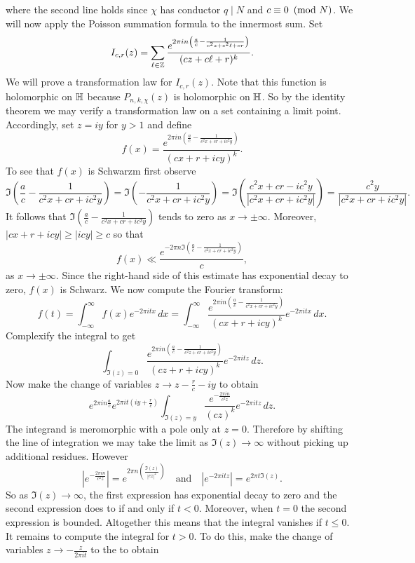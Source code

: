       where the second line holds since $\chi$ has conductor $q \mid N$ and $c \equiv 0 \ \left(\text{mod }N\right)$. We will now apply the Poisson summation formula to the innermost sum. Set
      \[
        I_{c,r}(z) = \sum_{\ell \in \mathbb{Z}}\frac{e^{2\pi in\left(\frac{a}{c}-\frac{1}{c^{2}z+c^{2}\ell+cr}\right)}}{(cz+c\ell+r)^{k}}.
      \]
      We will prove a transformation law for $I_{c,r}(z)$. Note that this function is holomorphic on $\mathbb{H}$ because $P_{n,k,\chi}(z)$ is holomorphic on $\mathbb{H}$. So by the identity theorem we may verify a transformation law on a set containing a limit point. Accordingly, set $z = iy$ for $y > 1$ and define
      \[
        f(x) = \frac{e^{2\pi in\left(\frac{a}{c}-\frac{1}{c^{2}x+cr+ic^{2}y}\right)}}{(cx+r+icy)^{k}}.
      \]
      To see that $f(x)$ is Schwarzm first observe
      \[
        \Im\left(\frac{a}{c}-\frac{1}{c^{2}x+cr+ic^{2}y}\right) = \Im\left(-\frac{1}{c^{2}x+cr+ic^{2}y}\right) = \Im\left(\frac{c^{2}x+cr-ic^{2}y}{|c^{2}x+cr+ic^{2}y|}\right) = \frac{c^{2}y}{|c^{2}x+cr+ic^{2}y|}.
      \]
      It follows that $\Im\left(\frac{a}{c}-\frac{1}{c^{2}x+cr+ic^{2}y}\right)$ tends to zero as $x \to \pm\infty$. Moreover, $|cx+r+icy| \ge |icy| \ge c$ so that
      \[
        f(x) \ll \frac{e^{-2\pi n\Im\left(\frac{a}{c}-\frac{1}{c^{2}x+cr+ic^{2}y}\right)}}{c},
      \]
      as $x \to \pm\infty$. Since the right-hand side of this estimate has exponential decay to zero, $f(x)$ is Schwarz. We now compute the Fourier transform:
      \[
        \hat{f}(t) = \int_{-\infty}^{\infty}f(x)e^{-2\pi itx}\,dx = \int_{-\infty}^{\infty}\frac{e^{2\pi in\left(\frac{a}{c}-\frac{1}{c^{2}x+cr+ic^{2}y}\right)}}{(cx+r+icy)^{k}}e^{-2\pi itx}\,dx.
      \]
      Complexify the integral to get
      \[
        \int_{\Im(z) = 0}\frac{e^{2\pi in\left(\frac{a}{c}-\frac{1}{c^{2}z+cr+ic^{2}y}\right)}}{(cz+r+icy)^{k}}e^{-2\pi itz}\,dz.
      \]
      Now make the change of variables $z \to z-\frac{r}{c}-iy$ to obtain
      \[
        e^{2\pi in\frac{a}{c}}e^{2\pi it\left(iy+\frac{r}{c}\right)}\int_{\Im(z) = y}\frac{e^{-\frac{2\pi in}{c^{2}z}}}{(cz)^{k}}e^{-2\pi itz}\,dz.
      \]
      The integrand is meromorphic with a pole only at $z = 0$. Therefore by shifting the line of integration we may take the limit as $\Im(z) \to \infty$ without picking up additional residues. However
      \[
        \left|e^{-\frac{2\pi in}{c^{2}z}}\right| = e^{2\pi n\left(\frac{\Im(z)}{|cz|^{2}}\right)} \quad \text{and} \quad \left|e^{-2\pi itz}\right| = e^{2\pi t\Im(z)}.
      \]
      So as $\Im(z) \to \infty$, the first expression has exponential decay to zero and the second expression does to if and only if $t < 0$. Moreover, when $t = 0$ the second expression is bounded. Altogether this means that the integral vanishes if $t \le 0$. It remains to compute the integral for $t > 0$. To do this, make the change of variables $z \to - \frac{z}{2\pi it}$ to the to obtain
